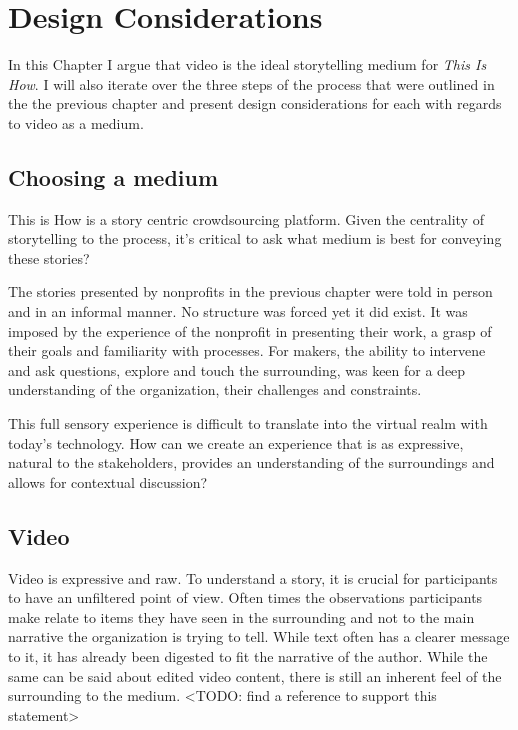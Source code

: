 \chapter{Design Considerations}
\label{chap_design_consider}

In this Chapter I argue that video is the ideal storytelling medium for \textit{This Is How}. I will also iterate over the three steps of the process that were outlined in the the previous chapter and present design considerations for each with regards to video as a medium. 

\section{Choosing a medium}

This is How is a story centric crowdsourcing platform. Given the centrality of storytelling to the process, it’s critical to ask what medium is best for conveying these stories?

The stories presented by nonprofits in the previous chapter were told in person and in an informal manner. No structure was forced yet it did exist. It was imposed by the experience of the nonprofit in presenting their work,  a grasp of their goals and familiarity with processes. For makers, the ability to intervene and ask questions, explore and touch the surrounding, was keen for a deep understanding of the organization, their challenges and constraints. 

This full sensory experience is difficult to translate into the virtual realm with today's technology. How can we create an experience that is as expressive, natural to the stakeholders, provides an understanding of the surroundings and allows for contextual discussion?

\section{Video}

Video is expressive and raw. To understand a story, it is crucial for participants to have an unfiltered point of view. Often times the observations participants make relate to items they have seen in the surrounding and not to the main narrative the organization is trying to tell. While text often has a clearer message to it, it has already been digested to fit the narrative of the author. While the same can be said about edited video content, there is still an inherent feel of the surrounding to the medium. <TODO: find a  reference to support this statement>

